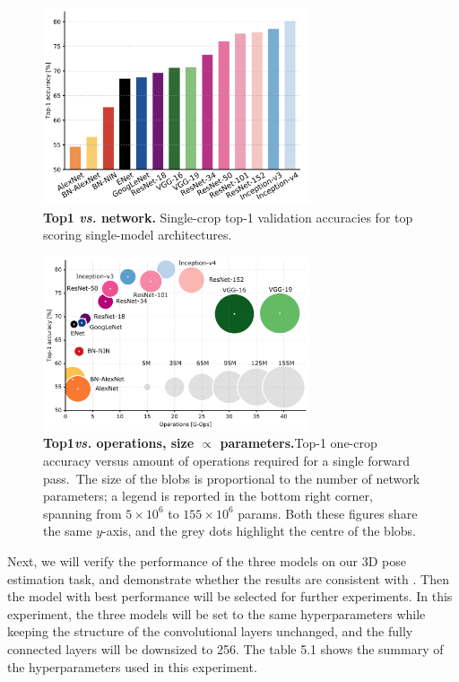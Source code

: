 \begin{figure}[h]
	\centering
	\includegraphics[width=0.7\textwidth]{Figures/Section5_Top1_acc_1}
	\caption{\textbf{Top1 \textit{vs.} network.} Single-crop top-1 validation accuracies for top scoring single-model architectures.\cite{canziani2016analysis} }
	\label{fig:Top1_1}
\end{figure}
\begin{figure}[h]
	\centering
	\includegraphics[width=0.7\textwidth]{Figures/Section5_Top1_acc}
	\caption{\textbf{Top1\textit{vs.} operations, size $\propto$ parameters.}Top-1 one-crop accuracy versus amount of operations required for a single forward pass.\ The size of the blobs is proportional to the number of network parameters; a legend is reported in the bottom right corner, spanning from $5\times10^{6}$ to $ 155\times10^{6} $ params.  Both these figures share the same $y$-axis, and the grey dots highlight the centre of the blobs. \cite{canziani2016analysis}} 
	\label{fig:Top1_2}
\end{figure}


Next, we will verify the performance of the three models on our 3D pose estimation task, and demonstrate whether the results are consistent with \cite{canziani2016analysis}. Then the model with best performance will be selected for further experiments. In this experiment, the three models will be set to the same hyperparameters while keeping the structure of the convolutional layers unchanged, and the fully connected layers will be downsized to 256. The table 5.1 shows the summary of the hyperparameters used in this experiment.

